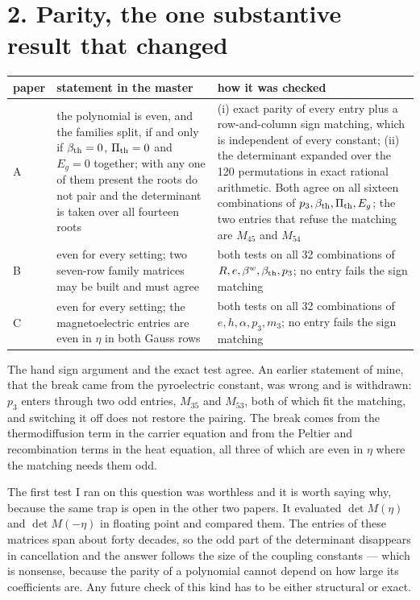 \documentclass[11pt]{article}
\begin{document}
\section*{2. Parity, the one substantive result that changed}

\begin{center}
\begin{tabular}{p{2.2cm}p{7.0cm}p{4.6cm}}
\toprule
paper & statement in the master & how it was checked\\
\midrule
A & the polynomial is even, and the families split, if and only if $\beta_{\rm th}=0$, $\Pi_{\rm th}=0$
and $E_g=0$ together; with any one of them present the roots do not pair and the determinant is taken over
all fourteen roots & (i) exact parity of every entry plus a row-and-column sign matching, which is
independent of every constant; (ii) the determinant expanded over the 120 permutations in exact rational
arithmetic. Both agree on all sixteen combinations of $p_3,\beta_{\rm th},\Pi_{\rm th},E_g$; the two
entries that refuse the matching are $M_{45}$ and $M_{54}$\\
B & even for every setting; two seven-row family matrices may be built and must agree & both tests on all
32 combinations of $R,e,\beta^{w},\beta_{\rm th},p_3$; no entry fails the sign matching\\
C & even for every setting; the magnetoelectric entries are even in $\eta$ in both Gauss rows & both tests
on all 32 combinations of $e,h,\alpha,p_3,m_3$; no entry fails the sign matching\\
\bottomrule
\end{tabular}
\end{center}

The hand sign argument and the exact test agree. An earlier statement of mine, that the break came from the
pyroelectric constant, was wrong and is withdrawn: $p_3$ enters through two odd entries, $M_{35}$ and
$M_{53}$, both of which fit the matching, and switching it off does not restore the pairing. The break
comes from the thermodiffusion term in the carrier equation and from the Peltier and recombination terms in
the heat equation, all three of which are even in $\eta$ where the matching needs them odd.

The first test I ran on this question was worthless and it is worth saying why, because the same trap is
open in the other two papers. It evaluated $\det M(\eta)$ and $\det M(-\eta)$ in floating point and
compared them. The entries of these matrices span about forty decades, so the odd part of the determinant
disappears in cancellation and the answer follows the size of the coupling constants --- which is nonsense,
because the parity of a polynomial cannot depend on how large its coefficients are. Any future check of
this kind has to be either structural or exact.
\end{document}
